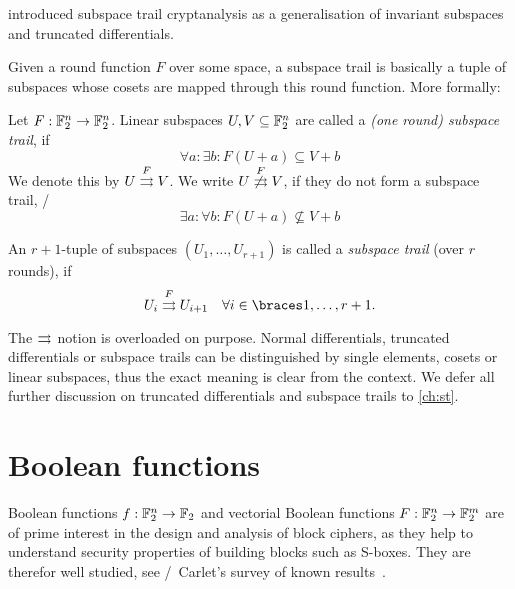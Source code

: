 \textcite{ToSC:GraRecRon16} introduced subspace trail cryptanalysis as a generalisation of invariant subspaces and truncated differentials.

Given a round function $F$ over some space, a subspace trail is basically a tuple of subspaces whose cosets are mapped through this round function.
More formally:
\begin{definition}\label{st:def:subspace-trail}
    Let $F : \mathbb{F}_2^n \to \mathbb{F}_2^n$.
    Linear subspaces $U, V \subseteq \mathbb{F}_2^n$ are called a \emph{(one round) subspace trail}, if
    \begin{equation*}
        \forall a : \exists b : F(U+a) \subseteq V+b
    \end{equation*}
    We denote this by $U \stackrel{F}{\rightrightarrows} V$.
    We write $U \stackrel{F}{\not\rightrightarrows} V$, if they do not form a subspace trail, \ie/
    \begin{equation*}
        \exists a : \forall b : F(U+a) \nsubseteq V+b
    \end{equation*}

    An $r+1$-tuple of subspaces $(U_1, \ldots, U_{r+1})$ is called a \emph{subspace trail} (over $r$ rounds), if
    \begin{equation*}
        \subspacetrail{U_i}{F}{U_{i+1}} \quad \forall i \in \set{1, \ldots, r+1}.
    \end{equation*}
\end{definition}

The $\operatorname*{\rightrightarrows}^{}_{}$ notion is overloaded on purpose.
Normal differentials, truncated differentials or subspace trails can be distinguished by single elements, cosets or linear subspaces, thus the exact meaning is clear from the context.
We defer all further discussion on truncated differentials and subspace trails to \cref{ch:st}.

\section{Boolean functions}\label{sec:prelim:bf}
Boolean functions $f : \mathbb{F}_2^n \to \mathbb{F}_2$ and vectorial Boolean functions $F : \mathbb{F}_2^n \to \mathbb{F}_2^m$ are of prime interest in the design and analysis of block ciphers, as they help to understand security properties of building blocks such as S-boxes.
They are therefor well studied, see \eg/~Carlet's survey of known results~\cite{BMM:Carlet10a,BMM:Carlet10b}.

